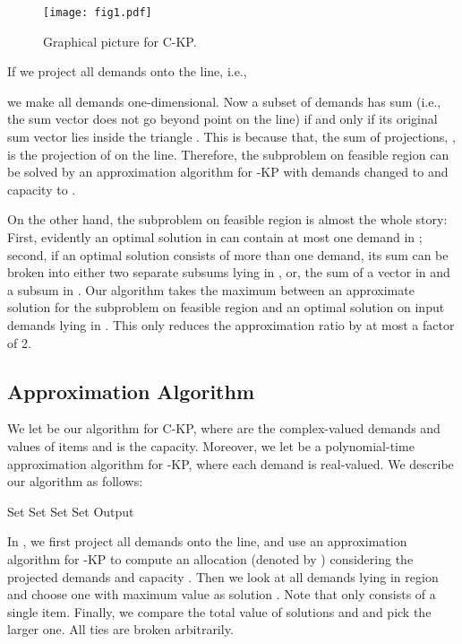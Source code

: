 \documentclass{aamas2013}
\begin{document}
\begin{figure}[htb!]
 \centering 
 \texttt{[image: fig1.pdf]} \caption{Graphical picture for C-KP.} \label{fig:fig1}
\end{figure}



If we project all demands onto the  line, i.e., 

we make all demands one-dimensional.  Now a subset of demands has sum  (i.e., the sum vector does not go beyond point  on the  line) if and only if its original sum vector  lies inside the triangle .  This is because that, the sum of projections, , is the projection of  on the  line.  Therefore, the subproblem on feasible region  can be solved by an approximation algorithm for {-KP} with demands changed to  and capacity to .

On the other hand, the subproblem on feasible region  is almost the whole story: First, evidently an optimal solution in  can contain at most one demand in ; second, if an optimal solution consists of more than one demand, its sum can be broken into either two separate subsums lying in , or, the sum of a vector in  and a subsum in .  Our algorithm takes the maximum between an approximate solution for the subproblem on feasible region  and an optimal solution on input demands lying in .  This only reduces the approximation ratio by at most a factor of 2.




\subsection{Approximation Algorithm}
\noindent 
We let  be our algorithm for {\sc C-KP}, where  are the complex-valued demands and values of items and  is the capacity. Moreover, we let  be a polynomial-time approximation algorithm for {-KP}, where each demand is real-valued.
We describe our algorithm as follows:

\begin{algorithm}[htb!]
\caption{}
\begin{algorithmic}[1]
\FOR{} 
\STATE Set 
\ENDFOR
\STATE Set 
\STATE Set 
\STATE Set 
\STATE Output 
\end{algorithmic}
\end{algorithm}

In , we first project all demands onto the  line, 
and use an approximation algorithm  for {-KP} to compute an allocation (denoted by ) considering the projected demands and capacity .  Then we look at all demands lying in region  and choose one with maximum value as solution .  Note that  only consists of a single item.  Finally, we compare the total value of solutions  and  and pick the larger one.  All ties are broken arbitrarily.   
\end{document}
